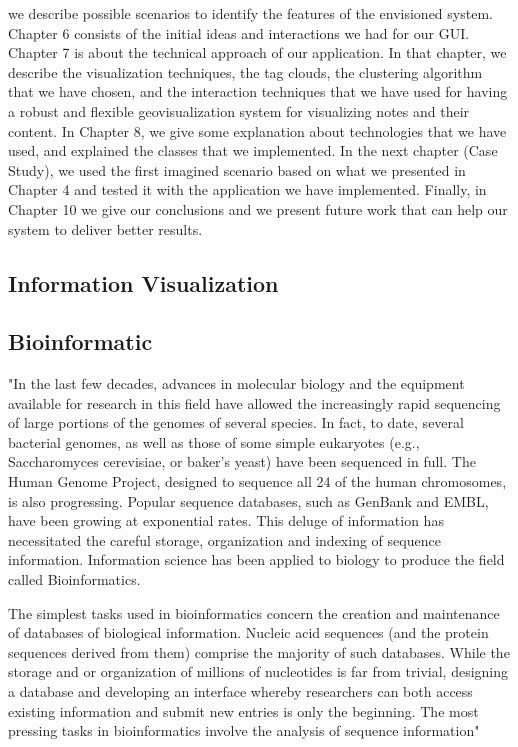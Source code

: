 \documentclass[a4paper,oneside]{article}
\begin{document}
we describe possible scenarios to identify the features of the envisioned system.  Chapter 6 consists of the initial ideas and interactions we had for our GUI. Chapter 7 is about the technical approach of our application. In that chapter, we describe the visualization techniques, the tag clouds, the clustering algorithm that we have chosen, and the interaction techniques that we have used for having a robust and flexible geovisualization system for visualizing notes and their content. In Chapter 8, we give some explanation about technologies that we have used, and explained the classes that we implemented. In the next chapter (Case Study), we used the first imagined scenario based on what we presented in Chapter 4 and tested it with the application we have implemented. Finally, in Chapter 10 we give our conclusions and we present future work that can help our system to deliver better results.

\subsection{Information Visualization}

\subsection{Bioinformatic}
\label{bioinformatic}

"In the last few decades, advances in molecular biology and the equipment available for research in this field have allowed the increasingly rapid sequencing of large portions of the genomes of several species. In fact, to date, several bacterial genomes, as well as those of some simple eukaryotes (e.g., Saccharomyces cerevisiae, or baker's yeast) have been sequenced in full. The Human Genome Project, designed to sequence all 24 of the human chromosomes, is also progressing. Popular sequence databases, such as GenBank and EMBL, have been growing at exponential rates. This deluge of information has necessitated the careful storage, organization and indexing of sequence information. Information science has been applied to biology to produce the field called Bioinformatics.


The simplest tasks used in bioinformatics concern the creation and maintenance of databases of biological information. Nucleic acid sequences (and the protein sequences derived from them) comprise the majority of such databases. While the storage and or organization of millions of nucleotides is far from trivial, designing a database and developing an interface whereby researchers can both access existing information and submit new entries is only the beginning. The most pressing tasks in bioinformatics involve the analysis of sequence information"~\cite{Biology}
\end{document}
